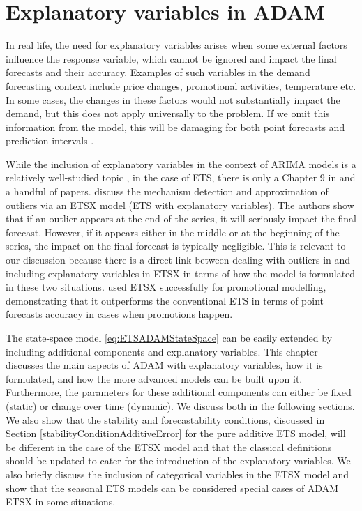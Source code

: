 \documentclass[]{book}
\theoremstyle{definition}
\theoremstyle{definition}
\theoremstyle{definition}
\theoremstyle{definition}
\theoremstyle{remark}
\begin{document}
\hypertarget{ADAMX}{%
\chapter{Explanatory variables in ADAM}\label{ADAMX}}

In real life, the need for explanatory variables arises when some external factors influence the response variable, which cannot be ignored and impact the final forecasts and their accuracy. Examples of such variables in the demand forecasting context include price changes, promotional activities, temperature etc. In some cases, the changes in these factors would not substantially impact the demand, but this does not apply universally to the problem. If we omit this information from the model, this will be damaging for both point forecasts and prediction intervals \citep[see discussion in Chapter 12 of][]{SvetunkovSBA}.

While the inclusion of explanatory variables in the context of ARIMA models is a relatively well-studied topic \citep[for example, this was discussed by][]{Box1976}, in the case of ETS, there is only a Chapter 9 in \citet{Hyndman2008b} and a handful of papers. \citet{Koehler2012} discuss the mechanism detection and approximation of outliers via an ETSX model (ETS with explanatory variables). The authors show that if an outlier appears at the end of the series, it will seriously impact the final forecast. However, if it appears either in the middle or at the beginning of the series, the impact on the final forecast is typically negligible. This is relevant to our discussion because there is a direct link between dealing with outliers in \citet{Koehler2012} and including explanatory variables in ETSX in terms of how the model is formulated in these two situations. \citet{Kourentzes2015} used ETSX successfully for promotional modelling, demonstrating that it outperforms the conventional ETS in terms of point forecasts accuracy in cases when promotions happen.

The state-space model \eqref{eq:ETSADAMStateSpace} can be easily extended by including additional components and explanatory variables. This chapter discusses the main aspects of ADAM with explanatory variables, how it is formulated, and how the more advanced models can be built upon it. Furthermore, the parameters for these additional components can either be fixed (static) or change over time (dynamic). We discuss both in the following sections. We also show that the stability and forecastability conditions, discussed in Section \ref{stabilityConditionAdditiveError} for the pure additive ETS model, will be different in the case of the ETSX model and that the classical definitions should be updated to cater for the introduction of the explanatory variables. We also briefly discuss the inclusion of categorical variables in the ETSX model and show that the seasonal ETS models can be considered special cases of ADAM ETSX in some situations.
\end{document}
